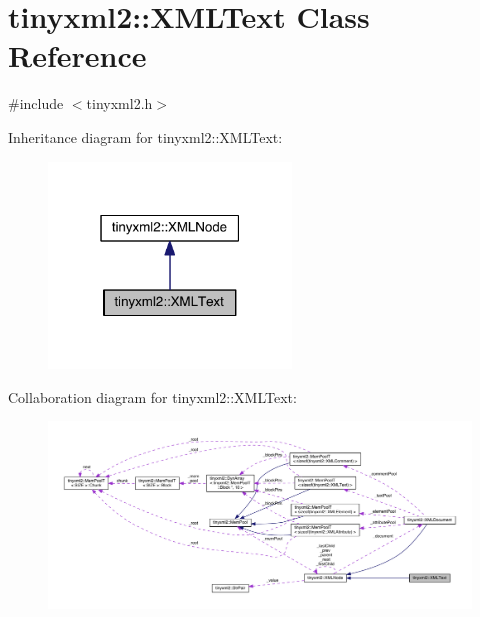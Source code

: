 \hypertarget{classtinyxml2_1_1_x_m_l_text}{}\section{tinyxml2\+:\+:X\+M\+L\+Text Class Reference}
\label{classtinyxml2_1_1_x_m_l_text}


{\ttfamily \#include $<$tinyxml2.\+h$>$}



Inheritance diagram for tinyxml2\+:\+:X\+M\+L\+Text\+:\nopagebreak
\begin{figure}[H]
\begin{center}
\leavevmode
\includegraphics[width=183pt]{classtinyxml2_1_1_x_m_l_text__inherit__graph}
\end{center}
\end{figure}


Collaboration diagram for tinyxml2\+:\+:X\+M\+L\+Text\+:\nopagebreak
\begin{figure}[H]
\begin{center}
\leavevmode
\includegraphics[width=350pt]{classtinyxml2_1_1_x_m_l_text__coll__graph}
\end{center}
\end{figure}
